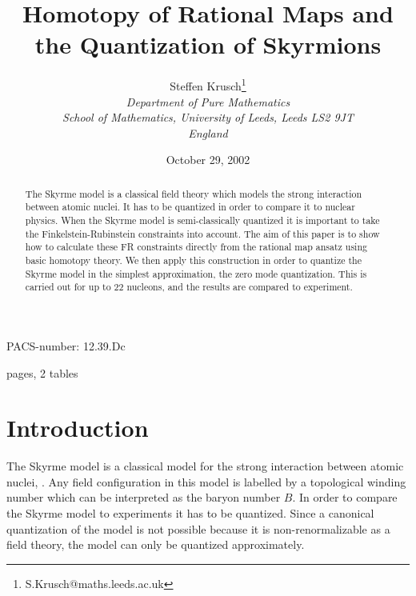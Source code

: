 \documentclass[a4paper,12pt]{article}
\begin{document}
\title{
  \vskip 15pt
  {\bf \Large \bf Homotopy of Rational Maps and the
    Quantization of Skyrmions}
  \vskip 10pt}
\author{
Steffen Krusch\thanks{S.Krusch@maths.leeds.ac.uk } \\[5pt]
{\normalsize {\sl Department of Pure Mathematics }}\\
{\normalsize {\sl School of Mathematics, University of Leeds,
Leeds LS2 9JT}}\\
{\normalsize {\sl England}} 
}

\date{October 29, 2002}

\maketitle

\begin{abstract}
The Skyrme model is a classical field theory which models the strong 
interaction between atomic nuclei. It has to be quantized in order to 
compare it to nuclear physics. When the Skyrme model is semi-classically 
quantized it is important to take the Finkelstein-Rubinstein constraints 
into account. The aim of this paper is to show how to calculate these FR 
constraints directly from the rational map ansatz using basic homotopy 
theory. We then apply this construction in order to quantize the Skyrme 
model in the simplest approximation, the zero mode quantization. This is 
carried out for up to 22 nucleons, and the results are compared to 
experiment.
\end{abstract}

\vspace{2cm} 
\centerline{PACS-number: 12.39.Dc}
\vspace{2cm}
\begin{tt}
\pageref{lastref} pages, 2 tables
\end{tt}



\newpage

\section{Introduction}

The Skyrme model is a classical model for the strong interaction
between atomic nuclei, \cite{Skyrme:1961vq}.  Any field configuration
in this model is labelled by a topological winding number which can be
interpreted as the baryon number $B$. In order to compare the Skyrme
model to experiments it has to be quantized.  Since a canonical
quantization of the model is not possible because it is
non-renormalizable as a field theory, the model can only be quantized
approximately. 
\end{document}
